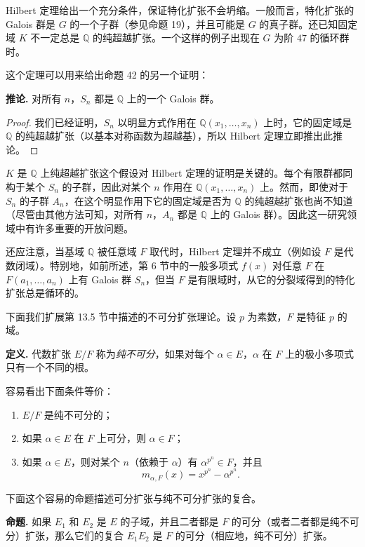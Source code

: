 Hilbert 定理给出一个充分条件，保证特化扩张不会坍缩。一般而言，特化扩张的 Galois 群是 $G$ 的一个子群（参见命题 19），并且可能是 $G$ 的真子群。还已知固定域 $K$ 不一定总是 $\mathbb Q$ 的纯超越扩张。一个这样的例子出现在 $G$ 为阶 $47$ 的循环群时。

这个定理可以用来给出命题 42 的另一个证明：

\noindent\textbf{推论.} 对所有 $n$，$S_n$ 都是 $\mathbb Q$ 上的一个 Galois 群。

\begin{proof}
我们已经证明，$S_n$ 以明显方式作用在 $\mathbb Q(x_1,\ldots,x_n)$ 上时，它的固定域是 $\mathbb Q$ 的纯超越扩张（以基本对称函数为超越基），所以 Hilbert 定理立即推出此推论。
\end{proof}

$K$ 是 $\mathbb Q$ 上纯超越扩张这个假设对 Hilbert 定理的证明是关键的。每个有限群都同构于某个 $S_n$ 的子群，因此对某个 $n$ 作用在 $\mathbb Q(x_1,\ldots,x_n)$ 上。然而，即使对于 $S_n$ 的子群 $A_n$，在这个明显作用下它的固定域是否为 $\mathbb Q$ 的纯超越扩张也尚不知道（尽管由其他方法可知，对所有 $n$，$A_n$ 都是 $\mathbb Q$ 上的 Galois 群）。因此这一研究领域中有许多重要的开放问题。

还应注意，当基域 $\mathbb Q$ 被任意域 $F$ 取代时，Hilbert 定理并不成立（例如设 $F$ 是代数闭域）。特别地，如前所述，第 6 节中的一般多项式 $f(x)$ 对任意 $F$ 在 $F(a_1,\ldots,a_n)$ 上有 Galois 群 $S_n$，但当 $F$ 是有限域时，从它的分裂域得到的特化扩张总是循环的。

下面我们扩展第 13.5 节中描述的不可分扩张理论。设 $p$ 为素数，$F$ 是特征 $p$ 的域。

\noindent\textbf{定义.} 代数扩张 $E/F$ 称为\emph{纯不可分}，如果对每个 $\alpha\in E$，$\alpha$ 在 $F$ 上的极小多项式只有一个不同的根。

容易看出下面条件等价：
\begin{enumerate}[label=(\arabic*)]
\item $E/F$ 是纯不可分的；
\item 如果 $\alpha\in E$ 在 $F$ 上可分，则 $\alpha\in F$；
\item 如果 $\alpha\in E$，则对某个 $n$（依赖于 $\alpha$）有 $\alpha^{p^n}\in F$，并且
\[
 m_{\alpha,F}(x)=x^{p^n}-\alpha^{p^n}.
\]
\end{enumerate}

下面这个容易的命题描述可分扩张与纯不可分扩张的复合。

\noindent\textbf{命题.} 如果 $E_1$ 和 $E_2$ 是 $E$ 的子域，并且二者都是 $F$ 的可分（或者二者都是纯不可分）扩张，那么它们的复合 $E_1E_2$ 是 $F$ 的可分（相应地，纯不可分）扩张。

